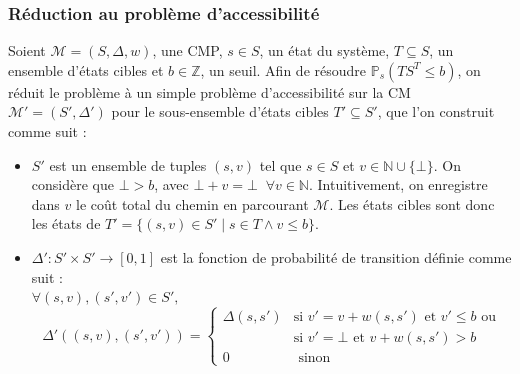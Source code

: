 \documentclass[12pt,a4paper]{report}
\theoremstyle{definition}%
\theoremstyle{remark}
\newcommand{\pr}{\mathbb{P}}
\let\labelitemi\labelitemii
\begin{document}
\subsubsection*{Réduction au problème d'accessibilité}
Soient $\mathcal{M} = (S, \Delta, w)$, une CMP, $s \in S$, un état du système, $T \subseteq S$, un ensemble d'états cibles et $b \in \mathbb{Z}$, un seuil. Afin de résoudre $\pr_s(TS^T \leq b)$, on réduit le problème à un simple problème d'accessibilité sur la CM $\mathcal{M}' = (S', \Delta')$ pour le sous-ensemble d'états cibles $T' \subseteq S'$, que l'on construit comme suit :
\begin{itemize}
	\renewcommand{\labelitemi}{\tiny$\bullet$}
	\item $S'$ est un ensemble de tuples $(s, v)$ tel que $s \in S $ et $v \in \mathbb{N} \cup \{ \bot \}$. On considère que $\bot > b$, avec $\bot + v = \bot \; \; \forall v \in \mathbb{N}$. Intuitivement, on enregistre dans $v$ le coût total du chemin en parcourant $\mathcal{M}$. Les états cibles sont donc les états de $T' = \{ (s, v) \in S' \; | \; s \in T \wedge v \leq b \}$.
	\item $\Delta': S' \times S' \rightarrow [0,1]$ est la fonction de probabilité de transition définie comme suit :\\
	$\forall (s, v), (s', v') \in S',$
	\[
		\Delta'((s, v), (s', v')) =
		\begin{cases}
		\Delta(s, s') & \text{si $v' = v + w(s, s')$ et $v' \leq b$  ou} \\
		 & \text{si $v' = \bot$ et $v + w(s, s') > b$} \\
		 0 & \text{ sinon}
		\end{cases}
	\]


\end{itemize}
\end{document}
